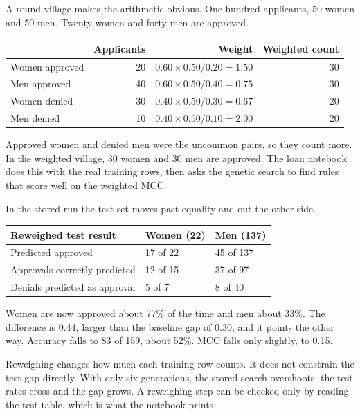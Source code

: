 \documentclass[11pt]{article}
\newcommand{\pct}[1]{\mbox{#1\%}}
\begin{document}
A round village makes the arithmetic obvious. One hundred applicants, 50 women and 50 men. Twenty women and forty men are approved.

\begin{table}[H]
\centering
\small
\begin{tabular}{@{}l r r r@{}}
\toprule
 & Applicants & Weight & Weighted count \\
\midrule
Women approved & 20 & \(0.60 \times 0.50 / 0.20 = 1.50\) & 30 \\
Men approved & 40 & \(0.60 \times 0.50 / 0.40 = 0.75\) & 30 \\
Women denied & 30 & \(0.40 \times 0.50 / 0.30 = 0.67\) & 20 \\
Men denied & 10 & \(0.40 \times 0.50 / 0.10 = 2.00\) & 20 \\
\bottomrule
\end{tabular}
\end{table}

\noindent
Approved women and denied men were the uncommon pairs, so they count more. In the weighted village, 30 women and 30 men are approved. The loan notebook does this with the real training rows, then asks the genetic search to find rules that score well on the weighted MCC.

In the stored run the test set moves past equality and out the other side.

\begin{table}[H]
\centering
\small
\begin{tabularx}{\textwidth}{@{}l Y Y@{}}
\toprule
Reweighed test result & Women (22) & Men (137) \\
\midrule
Predicted approved & 17 of 22 & 45 of 137 \\
Approvals correctly predicted & 12 of 15 & 37 of 97 \\
Denials predicted as approval & 5 of 7 & 8 of 40 \\
\bottomrule
\end{tabularx}
\end{table}

Women are now approved about \pct{77} of the time and men about \pct{33}. The difference is 0.44, larger than the baseline gap of 0.30, and it points the other way. Accuracy falls to 83 of 159, about \pct{52}. MCC falls only slightly, to 0.15.

\begin{idea}
Reweighing changes how much each training row counts. It does not constrain the test gap directly. With only six generations, the stored search overshoots: the test rates cross and the gap grows. A reweighing step can be checked only by reading the test table, which is what the notebook prints.
\end{idea}
\end{document}
